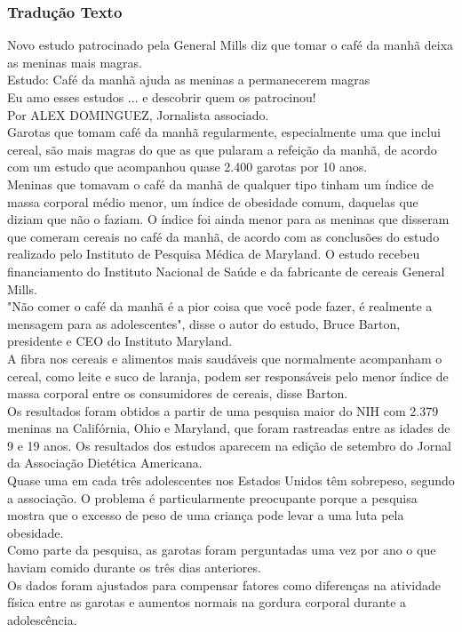\begin{frame}
\frametitle{Tradução Texto}
\justifying
\tiny{
Novo estudo patrocinado pela General Mills diz que tomar o café da manhã deixa as meninas mais magras.\\
\vspace{0.2 cm}
Estudo: Café da manhã ajuda as meninas a permanecerem magras\\
\vspace{0.2 cm}
Eu amo esses estudos ... e descobrir quem os patrocinou!\\
\vspace{0.2 cm}
Por ALEX DOMINGUEZ, Jornalista associado.\\
\vspace{0.5 cm}
Garotas que tomam café da manhã regularmente, especialmente uma que inclui cereal, são mais magras do que as que pularam a refeição da manhã, de acordo com um estudo que acompanhou quase 2.400 garotas por 10 anos.\\

Meninas que tomavam o café da manhã de qualquer tipo tinham um índice de massa corporal médio menor, um índice de obesidade comum, daquelas que diziam que não o faziam. O índice foi ainda menor para as meninas que disseram que comeram cereais no café da manhã, de acordo com as conclusões do estudo realizado pelo Instituto de Pesquisa Médica de Maryland. O estudo recebeu financiamento do Instituto Nacional de Saúde e da fabricante de cereais General Mills.\\

"Não comer o café da manhã é a pior coisa que você pode fazer, é realmente a mensagem para as adolescentes", disse o autor do estudo, Bruce Barton, presidente e CEO do Instituto Maryland.\\

A fibra nos cereais e alimentos mais saudáveis que normalmente acompanham o cereal, como leite e suco de laranja, podem ser responsáveis pelo menor índice de massa corporal entre os consumidores de cereais, disse Barton.\\

Os resultados foram obtidos a partir de uma pesquisa maior do NIH com 2.379 meninas na Califórnia, Ohio e Maryland, que foram rastreadas entre as idades de 9 e 19 anos. Os resultados dos estudos aparecem na edição de setembro do Jornal da Associação Dietética Americana.\\

Quase uma em cada três adolescentes nos Estados Unidos têm sobrepeso, segundo a associação. O problema é particularmente preocupante porque a pesquisa mostra que o excesso de peso de uma criança pode levar a uma luta pela obesidade.\\

Como parte da pesquisa, as garotas foram perguntadas uma vez por ano o que haviam comido durante os três dias anteriores.\\

Os dados foram ajustados para compensar fatores como diferenças na atividade física entre as garotas e aumentos normais na gordura corporal durante a adolescência.
}

\end{frame}

